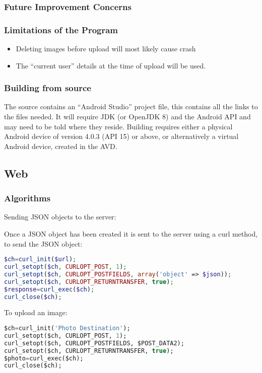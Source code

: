     \subsubsection{Future Improvement Concerns}


    \subsubsection{Limitations of the Program}
        \begin{itemize}
            \item Deleting images before upload will most likely cause crash
            \item The ``current user'' details at the time of upload will be used.
        \end{itemize}

    \subsubsection{Building from source}
        The source contains an ``Android Studio'' project file, this contains all the links to the files needed. It will require JDK (or OpenJDK 8) and the Android API and may need to be told where they reside. Building requires either a physical Android device of version 4.0.3 (API 15) or above, or alternatively a virtual Android device, created in the AVD.

\subsection{Web}
    \subsubsection{Algorithms}

        Sending JSON objects to the server:

        Once a JSON object has been created it is sent to the server using a curl method, to send the JSON object:

        \begin{lstlisting}[language=php]
$ch=curl_init($url);
curl_setopt($ch, CURLOPT_POST, 1);
curl_setopt($ch, CURLOPT_POSTFIELDS, array('object' => $json));
curl_setopt($ch, CURLOPT_RETURNTRANSFER, true);
$response=curl_exec($ch);
curl_close($ch);
        \end{lstlisting}

        To upload an image:
        \begin{lstlisting}[language=sql]
$ch=curl_init('Photo Destination');
curl_setopt($ch, CURLOPT_POST, 1);
curl_setopt($ch, CURLOPT_POSTFIELDS, $POST_DATA2);
curl_setopt($ch, CURLOPT_RETURNTRANSFER, true);
$photo=curl_exec($ch);
curl_close($ch); 
        \end{lstlisting}


